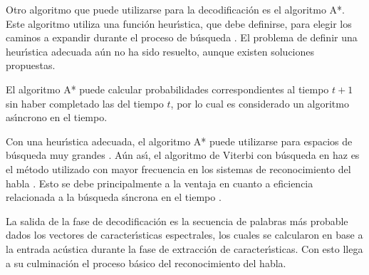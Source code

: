 Otro algoritmo que puede utilizarse para la decodificaci\'on es el algoritmo A*. Este algoritmo
utiliza una funci\'on heur{\'\i}stica, que debe definirse, para elegir los caminos a expandir
durante el proceso de b\'usqueda \cite{Russell2003Solving}. 
El problema de definir una heur{\'\i}stica adecuada a\'un no ha sido resuelto, aunque existen soluciones propuestas.

El algoritmo A* puede calcular probabilidades correspondientes al tiempo $t + 1$ sin haber completado 
las del tiempo $t$, por lo cual es considerado un algoritmo as{\'\i}ncrono en el tiempo.

Con una heur{\'\i}stica adecuada, el algoritmo A* puede utilizarse para espacios de b\'usqueda 
muy grandes \cite{huang-handbook10}.
A\'un as{\'\i}, el algoritmo de Viterbi con b\'usqueda en haz es el m\'etodo utilizado con mayor frecuencia
en los sistemas de reconocimiento del habla \cite{huang-handbook10}. 
Esto se debe principalmente a la ventaja en cuanto a eficiencia relacionada a la b\'usqueda s{\'\i}ncrona 
en el tiempo \cite{huang-handbook10}.

La salida de la fase de decodificaci\'on es la secuencia de palabras m\'as probable dados los vectores
de caracter{\'\i}sticas espectrales, los cuales se calcularon en base a la entrada ac\'ustica durante
la fase de extracci\'on de caracter{\'\i}sticas. Con esto llega a su culminaci\'on el proceso b\'asico
del reconocimiento del habla.
